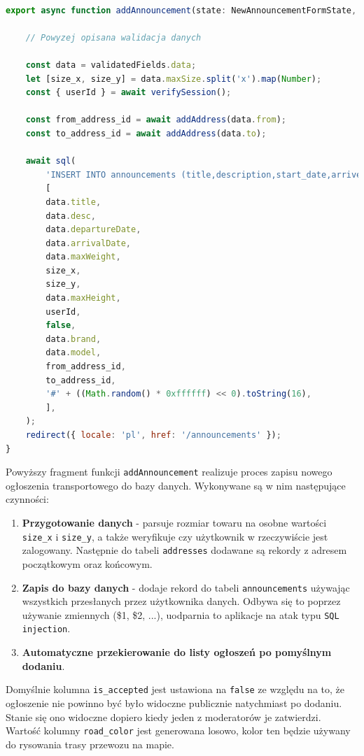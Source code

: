 {\belowcaptionskip=-9pt
\begin{lstlisting}[language=JavaScript,caption=Implementacja dodawania ogłoszenia do bazy danych, label=lst:addAnnouncementToDB]

export async function addAnnouncement(state: NewAnnouncementFormState, formData: FormData) {

    // Powyzej opisana walidacja danych

    const data = validatedFields.data;
    let [size_x, size_y] = data.maxSize.split('x').map(Number);
    const { userId } = await verifySession();

    const from_address_id = await addAddress(data.from);
    const to_address_id = await addAddress(data.to);

    await sql(
        'INSERT INTO announcements (title,description,start_date,arrive_date,max_weight,size_x,size_y,max_height,author_id,is_accepted,vehicle_brand,vehicle_model,from_address_id,to_address_id,road_color)VALUES($1,$2,$3,$4,$5,$6,$7,$8,$9,$10,$11,$12,$13,$14,$15)',
        [
        data.title,
        data.desc,
        data.departureDate,
        data.arrivalDate,
        data.maxWeight,
        size_x,
        size_y,
        data.maxHeight,
        userId,
        false,
        data.brand,
        data.model,
        from_address_id,
        to_address_id,
        '#' + ((Math.random() * 0xffffff) << 0).toString(16),
        ],
    );
    redirect({ locale: 'pl', href: '/announcements' });
}
\end{lstlisting}
}

\pagebreak
Powyższy fragment funkcji \texttt{addAnnouncement} realizuje proces zapisu nowego ogłoszenia transportowego do bazy danych. Wykonywane są w nim następujące czynności:
\begin{enumerate}
    \item \textbf{Przygotowanie danych} - parsuje rozmiar towaru na osobne wartości \texttt{size\_x} i \texttt{size\_y}, a także weryfikuje czy użytkownik w rzeczywiście jest zalogowany. Następnie do tabeli \texttt{addresses} dodawane są rekordy z adresem początkowym oraz końcowym.
    \item \textbf{Zapis do bazy danych} - dodaje rekord do tabeli \texttt{announcements} używając wszystkich przesłanych przez użytkownika danych. Odbywa się to poprzez używanie zmiennych (\$1, \$2, ...), uodparnia to aplikacje na atak typu \texttt{SQL injection}.
    \item \textbf{Automatyczne przekierowanie do listy ogłoszeń po pomyślnym dodaniu}.
\end{enumerate}
Domyślnie kolumna \texttt{is\_accepted} jest ustawiona na \texttt{false} ze względu na to, że ogłoszenie nie powinno być było widoczne publicznie natychmiast po dodaniu. Stanie się ono widoczne dopiero kiedy jeden z moderatorów je zatwierdzi. Wartość kolumny \texttt{road\_color} jest generowana losowo, kolor ten będzie używany do rysowania trasy przewozu na mapie.

